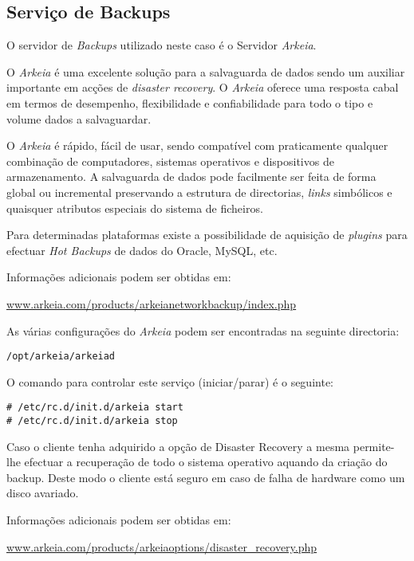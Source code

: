 \subsection{Serviço de Backups}

O servidor de \emph{Backups} utilizado neste caso é o Servidor \emph{Arkeia}.

O \emph{Arkeia} é uma excelente solução para a salvaguarda de dados sendo um auxiliar importante em acções de \emph{disaster recovery}. O \emph{Arkeia} oferece uma resposta cabal em termos de desempenho, flexibilidade e confiabilidade para todo o tipo e volume dados a salvaguardar.

O \emph{Arkeia} é rápido, fácil de usar, sendo compatível com praticamente qualquer combinação de computadores, sistemas operativos e dispositivos de armazenamento. A salvaguarda de dados pode facilmente ser feita de forma global ou incremental preservando a estrutura de directorias, \emph{links} simbólicos e quaisquer atributos especiais do sistema de ficheiros.

Para determinadas plataformas existe a possibilidade de aquisição de \textit{plugins} para efectuar \textit{Hot Backups} de dados do Oracle, MySQL, etc.

Informações adicionais podem ser obtidas em:\\ \begin{normalsize}\sffamily\href{http://www.arkeia.com/products/arkeianetworkbackup/index.php}{www.arkeia.com/products/arkeianetworkbackup/index.php}\end{normalsize}

As várias configurações do \emph{Arkeia} podem ser encontradas na seguinte directoria:

\begin{Verbatim}[commandchars=\\\{\}]
/opt/arkeia/arkeiad
\end{Verbatim}

O comando para controlar este serviço (iniciar/parar) é o seguinte:

\begin{Verbatim}[commandchars=\\\{\}]
# /etc/rc.d/init.d/arkeia start
# /etc/rc.d/init.d/arkeia stop
\end{Verbatim}

Caso o cliente tenha adquirido a opção de Disaster Recovery a mesma permite-lhe efectuar a recuperação de todo o sistema operativo aquando da criação do backup. Deste modo o cliente está seguro em caso de falha de hardware como um disco avariado.

Informações adicionais podem ser obtidas em:\\ \begin{normalsize}\sffamily\href{http://www.arkeia.com/products/arkeiaoptions/disaster\_recovery.php}{www.arkeia.com/products/arkeiaoptions/disaster\_recovery.php}\end{normalsize}
